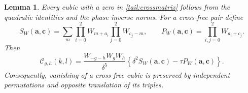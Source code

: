 \documentclass[11pt]{article}
\numberwithin{equation}{section}
\newtheorem{lemma}[theorem]{Lemma}
\theoremstyle{definition}
\theoremstyle{remark}
\begin{document}
\begin{lemma}\label{tail:collisions}
Every cubic with a zero in \eqref{tail:crossmatrix} follows
from the quadratic identities and the phase inverse norms.
For a cross-free pair define
\[
 S_W(\boldsymbol a,\boldsymbol c)
   =\sum_m\prod_{i=0}^2 W_{m+a_i}\prod_{j=0}^2W_{c_j-m},
 \qquad P_W(\boldsymbol a,\boldsymbol c)
   =\prod_{i,j=0}^2W_{a_i+c_j}.
\]
Then
\begin{equation}\label{tail:factor}
 \mathcal C_{g,h}(k,l)
 =\frac{W_{-g-h}W_gW_h}{\delta^5}
       \left\{\delta^2 S_W(\boldsymbol a,\boldsymbol c)
                      -\tau P_W(\boldsymbol a,\boldsymbol c)\right\}.
\end{equation}
Consequently, vanishing of a cross-free cubic is preserved
by independent permutations and opposite translation of its triples.
\end{lemma}
\end{document}

